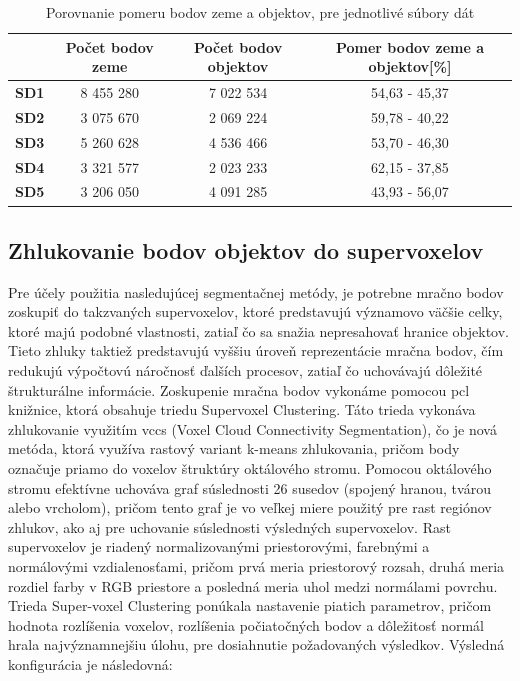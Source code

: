 \begin{table}
    \begin{center}
        \begin{tabular}{|c || c | c | c|} 
         \hline
          & \textbf{Počet bodov zeme} & \textbf{Počet bodov objektov} & \textbf{Pomer bodov zeme a objektov[\%]} \\ [0.5ex] 
         \hline\hline
         \textbf{SD1} & 8 455 280 & 7 022 534 & 54,63 - 45,37 \\ 
         \hline
         \textbf{SD2} & 3 075 670 & 2 069 224 & 59,78 - 40,22 \\
         \hline
         \textbf{SD3} &  5 260 628 & 4 536 466 & 53,70 - 46,30 \\
         \hline
         \textbf{SD4} & 3 321 577 & 2 023 233 & 62,15 - 37,85 \\
         \hline
         \textbf{SD5} & 3 206 050 & 4 091 285 & 43,93 - 56,07 \\ 
         \hline
        \end{tabular}
    \caption{Porovnanie pomeru bodov zeme a objektov, pre jednotlivé súbory dát}
    \label{table::ground_separation}
    \end{center}
\end{table}

\subsection{Zhlukovanie bodov objektov do supervoxelov}
\noindent Pre účely použitia nasledujúcej segmentačnej metódy, je potrebne mračno bodov zoskupiť do takzvaných supervoxelov, ktoré predstavujú významovo väčšie celky, ktoré majú podobné vlastnosti, zatiaľ čo sa snažia nepresahovať hranice objektov. Tieto zhluky taktiež predstavujú vyššiu úroveň reprezentácie mračna bodov, čím redukujú výpočtovú náročnosť ďalších procesov, zatiaľ čo uchovávajú dôležité štrukturálne informácie. 
\newline\indent Zoskupenie mračna bodov vykonáme pomocou \acrshort{pcl} knižnice, ktorá obsahuje triedu Supervoxel Clustering. Táto trieda vykonáva zhlukovanie využitím \acrshort{vccs} (Voxel Cloud Connectivity Segmentation), čo je nová metóda, ktorá využíva rastový variant k-means zhlukovania, pričom body označuje priamo do voxelov štruktúry oktálového stromu. Pomocou oktálového stromu efektívne uchováva graf súslednosti 26 susedov (spojený hranou, tvárou alebo vrcholom), pričom tento graf je vo veľkej miere použitý pre rast regiónov zhlukov, ako aj pre uchovanie súslednosti výsledných supervoxelov. Rast supervoxelov je riadený normalizovanými priestorovými, farebnými a normálovými vzdialenosťami, pričom prvá meria priestorový rozsah, druhá meria rozdiel farby v RGB priestore a posledná meria uhol medzi normálami povrchu. \cite{supervoxelClustering}
\newline\indent Trieda Super-voxel Clustering ponúkala nastavenie piatich parametrov, pričom hodnota rozlíšenia voxelov, rozlíšenia počiatočných bodov a dôležitosť normál hrala najvýznamnejšiu úlohu, pre dosiahnutie požadovaných výsledkov. Výsledná konfigurácia je následovná:

